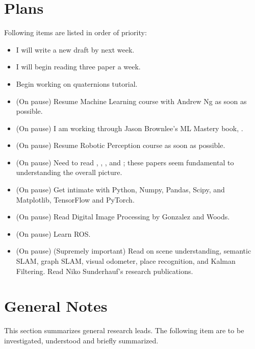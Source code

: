 \documentclass[11pt]{article}
\begin{document}
\section{Plans}
Following items are listed in order of priority: 

\begin{itemize} 

 \item I will write a new draft by next week.	
 
 \item I will begin reading three paper a week. 
 
 \item Begin working on quaternions tutorial.  

 \item (On pause) Resume Machine Learning course with Andrew Ng as soon as possible.  
 
 \item (On pause) I am working through Jason Brownlee's ML Mastery book, \cite{MLmasteryPy}.
 
 \item (On pause) Resume Robotic Perception course as soon as possible.

 \item (On pause) Need to read \cite{ImSRwDeepCNN}, \cite{MixDNNforSISR}, \cite{mModalSemanticSLAMwProb}, and \cite{RCANforImClass}; these papers seem fundamental to understanding the overall picture.

 \item (On pause) Get intimate with Python, Numpy, Pandas, Scipy, and Matplotlib, TensorFlow and PyTorch. 

 \item (On pause) Read Digital Image Processing by Gonzalez and Woods. 

 \item (On pause) Learn ROS.
 
 \item (On pause) (Supremely important) Read on scene understanding, semantic SLAM, graph SLAM, visual odometer, place recognition, and Kalman Filtering. Read Niko Sunderhauf's research publications. 
 
 \end{itemize}


\section{General Notes}
This section summarizes general research leads. The following item are to be investigated, understood and briefly summarized. 
\end{document}
